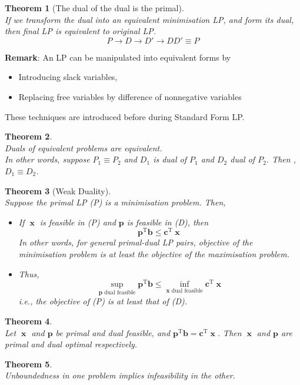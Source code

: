 \documentclass[12pt]{article}
\newcommand{\T}{\mathrm{T}}
\newtheorem{theorem}{Theorem}[section]
\theoremstyle{definition}
\DeclareMathOperator{\x}{\mathbf{x}}
\begin{document}
\begin{theorem}[The dual of the dual is the primal]
\hfill\\\normalfont If we transform the dual into an equivalent minimisation LP, and form its dual, then final LP is equivalent to original LP.
\[
P\to D \to D' \to DD' \equiv P
\]
\end{theorem}
\textbf{Remark}: An LP can be manipulated into equivalent forms by
\begin{itemize}
  \item Introducing slack variables,
  \item Replacing free variables by difference of nonnegative variables
\end{itemize}
These techniques are introduced before during Standard Form LP.
\begin{theorem}
\hfill\\\normalfont Duals of equivalent problems are equivalent.\\
In other words, suppose $P_1\equiv P_2$ and $D_1$ is dual of $P_1$ and $D_2$ dual of $P_2$. Then , $D_1\equiv D_2$.
\end{theorem}
\begin{theorem}[Weak Duality]
\hfill\\\normalfont Suppose the primal LP (P) is a minimisation problem. Then,
\begin{itemize}
  \item If $\x$ is feasible in (P) and $\mathbf{p}$ is feasible in (D), then
  \[
\mathbf{p}^\T\mathbf{b} \leq \mathbf{c}^\T\x
  \]
  In other words, for general primal-dual LP pairs, objective of the minimisation problem is at least the objective of the maximisation problem.
  \item Thus, 
  \[
\sup_{\mathbf{p} \text{ dual feasible}} \mathbf{p}^\T\mathbf{b}\leq \inf_{\x \text{ dual feasible}}\mathbf{c}^\T\x
  \]
  i.e., the objective of (P) is at least that of (D).
\end{itemize}
\end{theorem}
\begin{theorem}
\hfill\\\normalfont Let $\x$ and $\mathbf{p}$ be primal and dual feasible, and $\mathbf{p}^\T\mathbf{b}=\mathbf{c}^\T\x$. Then $\x$ and $\mathbf{p}$ are primal and dual optimal respectively.
\end{theorem}
\begin{theorem}
\hfill\\\normalfont Unboundedness in one problem implies infeasibility in the other.
\end{theorem}
\end{document}
